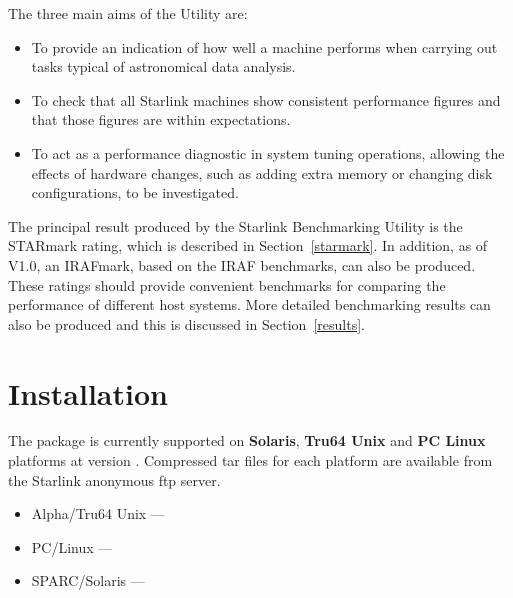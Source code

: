 The three main aims of the Utility are:

\begin{itemize}
\item To provide an indication of how well a machine performs when
carrying out tasks typical of astronomical data analysis.

\item To check that all Starlink machines show consistent performance
figures and that those figures are within expectations.

\item To act as a performance diagnostic in system tuning operations, allowing
the effects of hardware changes, such as adding extra memory or changing
disk configurations, to be investigated.
\end{itemize}

The principal result produced by the Starlink Benchmarking Utility is
the STARmark rating, which is described in Section~\ref{starmark}. In
addition, as of V1.0, an IRAFmark, based on the IRAF benchmarks, can
also be produced. These ratings should provide convenient benchmarks
for comparing the performance of different host systems. More detailed
benchmarking results can also be produced and this is discussed in
Section~\ref{results}.



\section{Installation}

The package is currently supported on {\textbf{Solaris}}, {\textbf{Tru64 Unix}}
and {\textbf{PC Linux}} platforms at version \pkgver.  Compressed tar
files for each platform are available from the Starlink anonymous ftp
server.

\begin{itemize}

\item Alpha/Tru64 Unix --- 

\item PC/Linux --- 

\item SPARC/Solaris --- 

\end{itemize}


